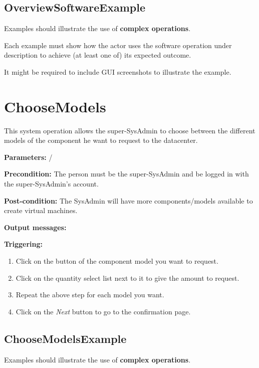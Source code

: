 \subsection{OverviewSoftwareExample}
Examples should illustrate the use of \textbf{complex operations}.

Each example must show how the actor uses the software operation under
description to achieve (at least one of) its expected outcome.

It might be required to include GUI screenshots to illustrate the example.










\section{ChooseModels}
\label{operation:choosemodels}
This system operation allows the super-SysAdmin to choose between the different
models of the component he want to request to the datacenter.

\begin{description}

\item \textbf{Parameters:} /
\item \textbf{Precondition:} The person must be the super-SysAdmin and be logged
in with the super-SysAdmin's account.
\item \textbf{Post-condition:} The SysAdmin will have more components/models
available to create virtual machines.
\item \textbf{Output messages:}

\item \textbf{Triggering:}
\begin{enumerate}
\item Click on the button of the component model you want to request.
\item Click on the quantity select list next to it to give the amount to
request.
\item Repeat the above step for each model you want.
\item Click on the \emph{Next} button to go to the confirmation page.
\end{enumerate}

 
\end{description}

\subsection{ChooseModelsExample}
Examples should illustrate the use of \textbf{complex operations}.

